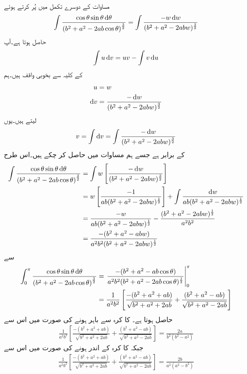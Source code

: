 مساوات  کے دوسرے تکمل میں  پُر کرتے ہوئے
\begin{align*}
\int \frac{\cos \theta \sin \theta \dif \theta}{ \left(b^2+a^2-2 ab \cos \theta \right)^{\frac{3}{2}}}=\int\frac{-w \dif w}{(b^2+a^2-2abw)^{\frac{3}{2}}}
\end{align*}
حاصل ہوتا ہے۔آپ
\begin{align*}
\int u \dif v = u v-\int v \dif u
\end{align*}
کے کلیہ سے بخوبی واقف ہیں۔ہم
\begin{align*}
u&=w\\
\dif v&=\frac{-\dif w}{(b^2+a^2-2abw)^{\frac{3}{2}}}
\end{align*}
لیتے ہیں۔یوں
\begin{align*}
v=\int \dif v = \int \frac{-\dif w}{(b^2+a^2-2abw)^{\frac{3}{2}}}
\end{align*}
کے برابر ہے جسے ہم مساوات  میں  حاصل کر چکے ہیں۔اس طرح
\begin{align*}
\int \frac{\cos \theta \sin \theta \dif \theta}{ \left(b^2+a^2-2 ab \cos \theta \right)^{\frac{3}{2}}}&=\int w \left[ \frac{-\dif w}{(b^2+a^2-2abw)^{\frac{3}{2}}} \right]\\
&=w \left[\frac{-1}{ab (b^2+a^2-2abw)^{\frac{1}{2}}}\right]+\int \frac{\dif w}{ab (b^2+a^2-2abw)^{\frac{1}{2}}}\\
&=\frac{-w}{ab (b^2+a^2-2abw)^{\frac{1}{2}}}-\frac{ (b^2+a^2-2abw)^{\frac{1}{2}}}{a^2b^2}\\
&=\frac{-(b^2+a^2-abw)}{a^2b^2(b^2+a^2-2abw)^{\frac{1}{2}}}
\end{align*}
سے
\begin{align*}
\int_0^{\pi} \frac{\cos \theta \sin \theta \dif \theta}{ \left(b^2+a^2-2 ab \cos \theta \right)^{\frac{3}{2}}}&=\left. \frac{-(b^2+a^2-ab\cos \theta)}{a^2b^2(b^2+a^2-2ab \cos \theta)^{\frac{1}{2}}} \right|_0^{\pi}\\
&=\frac{1}{a^2b^2} \left[\frac{-(b^2+a^2+ab)}{\sqrt{b^2+a^2+2ab}} +\frac{(b^2+a^2-ab)}{\sqrt{b^2+a^2-2ab}}\right]
\end{align*}
حاصل ہوتا ہے۔ کا کرہ سے باہر  ہونے کی صورت میں اس سے
\begin{align}\label{مساوات_کولمب_کرہ_کے_باہر_دوسرا_تکمل}
\frac{1}{a^2b^2} \left[\frac{-(b^2+a^2+ab)}{\sqrt{b^2+a^2+2ab}} +\frac{(b^2+a^2-ab)}{\sqrt{b^2+a^2-2ab}}\right]=\frac{2a}{b^2(b^2-a^2)}
\end{align}
جبکہ  کا کرہ کے اندر  ہونے کی صورت میں اس سے
\begin{align}\label{مساوات_کولمب_کرہ_کے_اندر_دوسرا_تکمل}
\frac{1}{a^2b^2} \left[\frac{-(b^2+a^2+ab)}{\sqrt{b^2+a^2+2ab}} +\frac{(b^2+a^2-ab)}{\sqrt{b^2+a^2-2ab}}\right]=\frac{2b}{a^2(a^2-b^2)}
\end{align}

